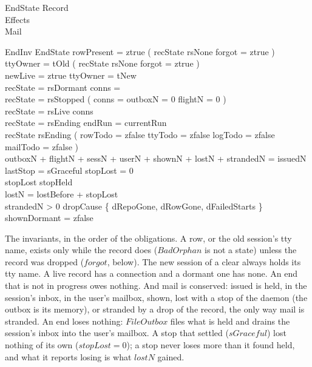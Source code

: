 \documentclass[a4paper,10pt,fleqn]{article}
\begin{document}
\begin{schema}{EndState}
  Record \\
  Effects \\
  Mail
\end{schema}

\begin{schema}{EndInv}
  EndState
  \where
  rowPresent = ztrue \implies ( recState \neq rsNone \lor forgot = ztrue ) \\
  ttyOwner = tOld \implies ( recState \neq rsNone \lor forgot = ztrue ) \\
  newLive = ztrue \implies ttyOwner = tNew \\
  recState = rsDormant \implies conns = \emptyset \\
  recState = rsStopped \implies
    ( conns = \emptyset \land outboxN = 0 \land flightN = 0 ) \\
  recState = rsLive \implies conns \neq \emptyset \\
  recState = rsEnding \implies endRun = currentRun \\
  recState \neq rsEnding \implies
    ( rowTodo = zfalse \land ttyTodo = zfalse \land logTodo = zfalse \land
      mailTodo = zfalse ) \\
  outboxN + flightN + sessN + userN + shownN + lostN + strandedN = issuedN \\
  lastStop = sGraceful \implies stopLost = 0 \\
  stopLost \leq stopHeld \\
  lostN = lostBefore + stopLost \\
  strandedN > 0 \implies
    dropCause \in \{ dRepoGone, dRowGone, dFailedStarts \} \\
  shownDormant = zfalse
\end{schema}

The invariants, in the order of the obligations.  A row, or the old session's tty
name, exists only while the record does ($BadOrphan$ is not a state) unless the
record was dropped ($forgot$, below).  The new
session of a clear always holds its tty name.  A live record has a connection and
a dormant one has none.  An end that is not in progress owes nothing.  And mail
is conserved: issued is held, in the session's inbox, in the user's mailbox,
shown, lost with a stop of the daemon (the outbox is its memory), or stranded
by a drop of the record, the only way mail is stranded.  An end loses nothing: $FileOutbox$ files
what is held and drains the session's inbox into the user's mailbox.  A stop that
settled ($sGraceful$) lost nothing of its own ($stopLost = 0$); a stop never loses
more than it found held, and what it reports losing is what $lostN$ gained.
\end{document}
